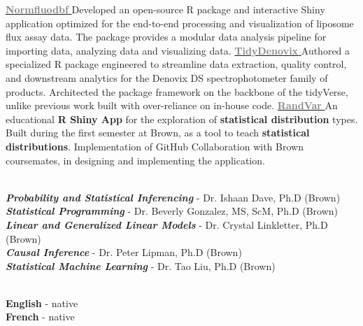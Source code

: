 \documentclass[9pt]{adeckcv} %
\begin{document}
  

\project
{\href{https://alphaprime7.github.io/normfluodbf/}{\textbf{ \textcolor{gray}{Normfluodbf}} }}
{}
{}
{}
{Developed an open-source R package and interactive Shiny application optimized for the end-to-end processing and visualization of liposome flux assay data.} 
{The package provides a modular data analysis pipeline for importing data, analyzing data and visualizing data.}
\project
{\href{https://alphaprime7.github.io/tidyDenovix/}{\textbf{ \textcolor{gray}{TidyDenovix}} }}
{}
{}
{}
{Authored a specialized R package engineered to streamline data extraction, quality control, and downstream analytics for the Denovix DS spectrophotometer family of products.}
{Architected the package framework on the backbone of the tidyVerse, unlike previous work built with over-reliance on in-house code.}
\project
{\href{https://alphaprime7.shinyapps.io/randvar/}{\textbf{ \textcolor{gray}{RandVar}} }}
{}
{}
{}
{An educational \textbf{R Shiny App} for the exploration of \textbf{statistical distribution} types. Built during the first semester at Brown, as a tool to teach \textbf{statistical distributions}.}
{Implementation of GitHub Collaboration with Brown coursemates, in designing and implementing the application.}


\begin{minipage}[t]{0.5\textwidth}
	\vspace{-\baselineskip}
	\\
	\textbf{\large{\textit{Probability and Statistical Inferencing}}} - Dr. Ishaan Dave, Ph.D (Brown) \\
  \textbf{\large{\textit{Statistical Programming}}} - Dr. Beverly Gonzalez, MS, ScM, Ph.D (Brown) \\
  \textbf{\large{\textit{Linear and Generalized Linear Models}}} - Dr. Crystal Linkletter, Ph.D (Brown) \\
  \textbf{\large{\textit{Causal Inference}}} - Dr. Peter Lipman, Ph.D (Brown) \\
  \textbf{\large{\textit{Statistical Machine Learning}}} - Dr. Tao Liu, Ph.D (Brown) \\

\end{minipage}
\hfill
\begin{minipage}[t]{0.3\textwidth}
	\vspace{-\baselineskip} %
	
	\\
	\textbf{English} - native\\
	\textbf{French} - native\\
\end{minipage}

\end{document}
